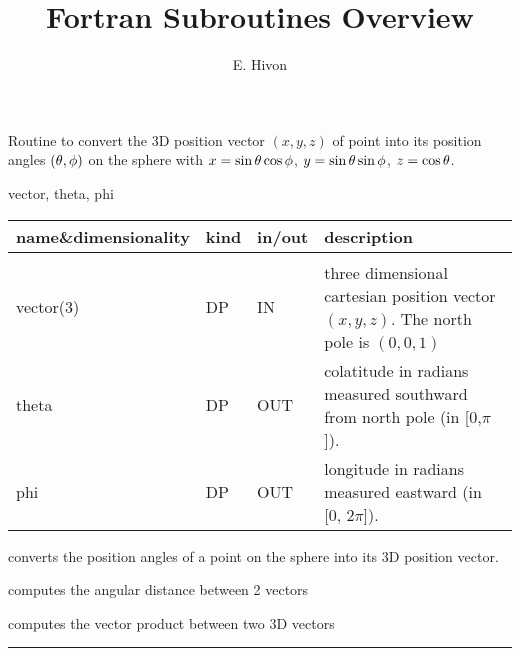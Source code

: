 

\sloppy


\title{\healpix Fortran Subroutines Overview}
 \section[vec2ang]{ }
\label{sub:vec2ang}
\author{E. Hivon}

\begin{facility}
{Routine to convert the 3D position vector $(x,y,z)$ of point into its position
  angles  $(\theta,\phi)$ on the sphere with
$x = \sin\theta\cos\phi$, $y=\sin\theta\sin\phi$, $z=\cos\theta$.
}
{\modPixTools}
\end{facility}

\begin{f90format}
{vector, theta, phi}
\end{f90format}


\begin{arguments}
{
\begin{tabular}{p{0.3\hsize} p{0.05\hsize} p{0.1\hsize} p{0.45\hsize}} \hline  
\textbf{name\&dimensionality} & \textbf{kind} & \textbf{in/out} & \textbf{description} \\ \hline
                   &   &   &                           \\ %
vector(3) & DP & IN & three dimensional cartesian position vector
                   $(x,y,z)$. The north pole is $(0,0,1)$\\
theta & DP & OUT & colatitude in radians measured southward from north pole (in
    [0,$\pi$]). \\
phi   & DP & OUT & longitude in radians measured eastward (in [0, $2\pi$]).\\
\end{tabular}
}
\end{arguments}

\begin{related}
  \begin{sulist}{} %
  \item[\htmlref{ang2vec}{sub:ang2vec}] converts the position angles of a point on the sphere 
into its 3D position vector.
  \item[\htmlref{angdist}{sub:angdist}] computes the angular distance between 2 vectors
  \item[\htmlref{vect\_prod}{sub:vect_prod}] computes the vector product between two 3D vectors
  \end{sulist}
\end{related}

\rule{\hsize}{2mm}

